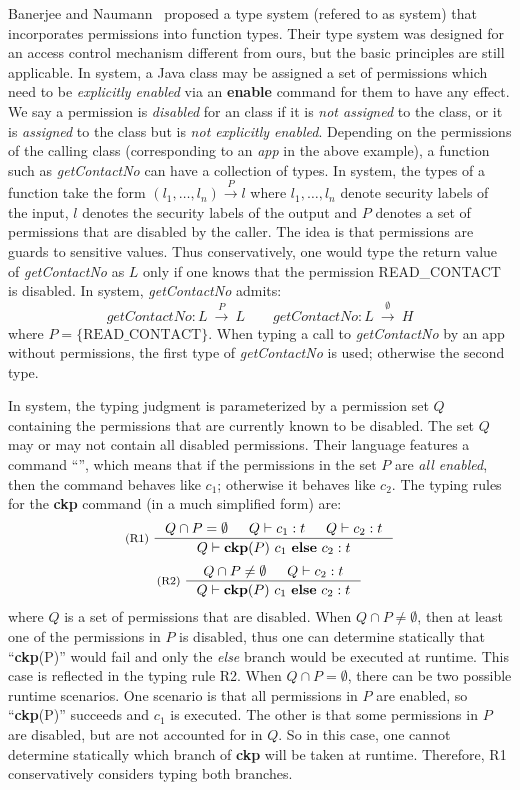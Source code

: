 Banerjee and Naumann~\cite{Banerjee:2005ht} proposed a type system (refered to as {\BN} system)
that incorporates permissions into function types.
Their type system was designed for an access control mechanism different from ours,
but the basic principles are still applicable.
In {\BN} system, a Java class may be assigned a set of permissions which need to be {\em explicitly enabled} via an \textbf{enable} command for them to have any effect.
We say a permission is {\em disabled} for an class if it is \emph{not assigned} to the class, or it is \emph{assigned} to the class but is \emph{not explicitly enabled}.
Depending on the permissions of
the calling class (corresponding to an \emph{app} in the above example), a function such as \textit{getContactNo} can have a collection of types. In {\BN} system, the types of a function take
the form $(l_1,\dots, l_n)\xrightarrow{~P~}l$
where $l_1,\dots,l_n$ denote security labels of the input, $l$ denotes the security labels of the output
and $P$ denotes a set of permissions that are disabled by the caller.
The idea is that permissions are guards to sensitive values. Thus conservatively, one would type the return value of \textit{getContactNo} as $L$ only if
one knows that the permission READ\_CONTACT is disabled.
In {\BN} system, \textit{getContactNo} admits:%
{\myeqsize\begin{equation*}
\textit{getContactNo} : L~\xrightarrow{~P~}~L\qquad
\textit{getContactNo} : L~\xrightarrow{~\emptyset~}~H
\end{equation*}}
where $P = \{ \mathrm{READ\_CONTACT} \}.$
When typing a call to \textit{getContactNo} by
an app without permissions,
the first type of \textit{getContactNo} is used; otherwise
the second type.%

In {\BN} system, the typing judgment is parameterized
by a permission set $Q$ containing the permissions that are
currently known to be disabled. The set $Q$ may or may not contain all disabled permissions.
Their language features a command ``'', which
means that if the permissions in the set $P$ are \emph{all enabled}, then
the command behaves like $c_1$; otherwise it behaves like $c_2$.
The typing rules for the \textbf{ckp} command (in a much
simplified form) are:
{\myeqsize\[
\inference[(R1)~]{
Q \cap P = \emptyset & Q |- c_1 : t & Q \vdash {c_2} : t
}
{
Q \vdash \lcCP{P}{c_1}{c_2} : t
}
\]
\[
\inference[(R2)~]{
Q \cap P \not = \emptyset & Q \vdash c_2 : t
}
{
Q \vdash \lcCP{P}{c_1}{c_2} : t
}
\]}
where $Q$ is a set of permissions that are disabled.
When $Q \cap P \not = \emptyset$, then
at least one of the permissions in $P$ is disabled, thus
one can determine statically that ``\textbf{ckp}(P)'' would fail and only the \emph{else} branch would be executed at runtime. This case is
reflected in the typing rule R2.
When $Q \cap P = \emptyset$, there can be two possible runtime scenarios.
One scenario is that all permissions in $P$ are enabled, so ``\textbf{ckp}(P)'' succeeds and $c_1$ is executed.
The other is that some permissions in $P$ are disabled, but are not accounted for in $Q$.
So in this case, one cannot determine statically which branch of \textbf{ckp} will be
taken at runtime. Therefore, R1 conservatively considers typing both branches.

